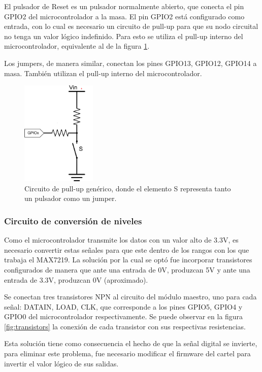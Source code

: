 El pulsador de Reset es un pulsador normalmente abierto, que conecta el pin GPIO2 del microcontrolador a la masa. El pin GPIO2 está configurado como entrada, con lo cual es necesario un circuito de pull-up para que su nodo circuital no tenga un valor lógico indefinido. Para esto se utiliza el pull-up interno del microcontrolador, equivalente al de la figura \ref{fig:pull-up}.

Los jumpers, de manera similar, conectan los pines GPIO13, GPIO12, GPIO14 a masa. También utilizan el pull-up interno del microcontrolador.

\begin{figure}[htp!]
	\centering
	\includegraphics[height=5cm]{imagenes/pullup_resistor.png}
	\caption{Circuito de pull-up genérico, donde el elemento S representa tanto un pulsador como un jumper.}
	\label{fig:pull-up}
\end{figure}

\subsubsection{Circuito de conversión de niveles} \label{sec:transistores}
Como el microcontrolador transmite los datos con un valor alto de 3.3V, es necesario convertir estas señales para que este dentro de los rangos con los que trabaja el MAX7219. La solución por la cual se optó fue incorporar transistores configurados de manera que ante una entrada de 0V, produzcan 5V y ante una entrada de 3.3V, produzcan 0V (aproximado). 

Se conectan tres transistores NPN al circuito del módulo maestro, uno para cada señal: DATAIN, LOAD, CLK, que corresponde a los pines GPIO5, GPIO4 y GPIO0 del microcontrolador respectivamente. 
Se puede observar en la figura \ref{fig:transistors} la conexión de cada transistor con sus respectivas resistencias. 

Esta solución tiene como consecuencia el hecho de que la señal digital se invierte, para eliminar este problema, fue necesario modificar el firmware del cartel para invertir el valor lógico de sus salidas.


